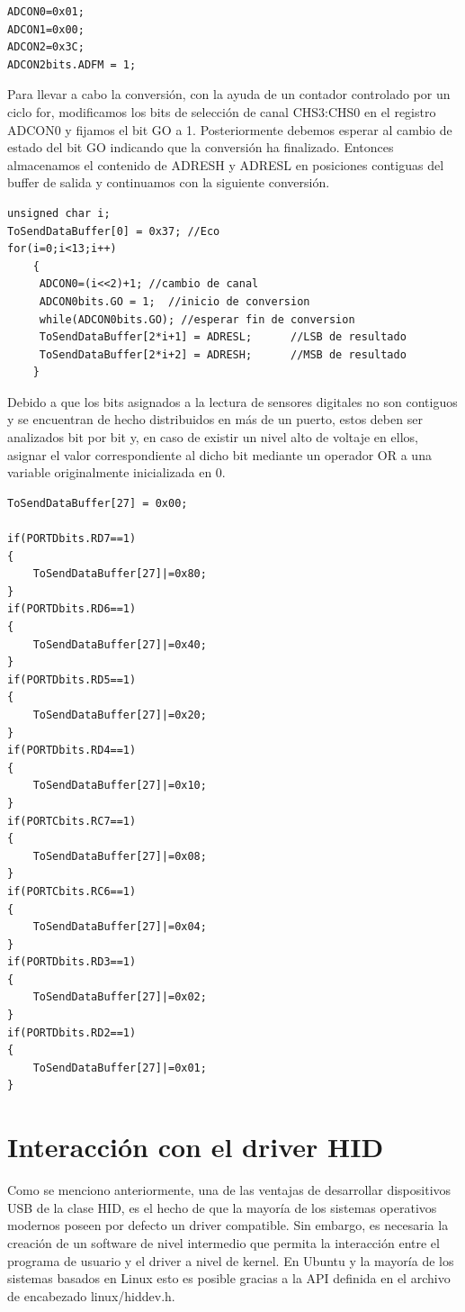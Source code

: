 \documentclass[letterpaper,openright,12pt]{book}
\begin{document}
\begin{lstlisting}
ADCON0=0x01;
ADCON1=0x00;
ADCON2=0x3C;
ADCON2bits.ADFM = 1;
\end{lstlisting}

Para llevar a cabo la conversión, con la ayuda de un contador controlado por un ciclo for, modificamos los bits de selección de canal CHS3:CHS0 en el registro ADCON0 y fijamos el bit GO a 1. Posteriormente debemos esperar al cambio de estado del bit GO indicando que la conversión ha finalizado. Entonces almacenamos el contenido de ADRESH y ADRESL en posiciones contiguas del buffer de salida y continuamos con la siguiente conversión.\\

\begin{lstlisting}
unsigned char i;
ToSendDataBuffer[0] = 0x37;	//Eco
for(i=0;i<13;i++)
	{						
	 ADCON0=(i<<2)+1; //cambio de canal					
	 ADCON0bits.GO = 1;  //inicio de conversion     
	 while(ADCON0bits.GO); //esperar fin de conversion
	 ToSendDataBuffer[2*i+1] = ADRESL;  	//LSB de resultado
	 ToSendDataBuffer[2*i+2] = ADRESH;  	//MSB de resultado
	}    
\end{lstlisting}

Debido a que los bits asignados a la lectura de sensores digitales no son contiguos y se encuentran de hecho distribuidos en más de un puerto, estos deben ser analizados bit por bit y, en caso de existir un nivel alto de voltaje en ellos, asignar el valor correspondiente al dicho bit mediante un operador OR a una variable originalmente inicializada en 0.

\begin{lstlisting}
ToSendDataBuffer[27] = 0x00;
						
if(PORTDbits.RD7==1)
{
	ToSendDataBuffer[27]|=0x80;
}
if(PORTDbits.RD6==1)
{
	ToSendDataBuffer[27]|=0x40;
}
if(PORTDbits.RD5==1)
{
	ToSendDataBuffer[27]|=0x20;
}
if(PORTDbits.RD4==1)
{
	ToSendDataBuffer[27]|=0x10;
}
if(PORTCbits.RC7==1)
{
	ToSendDataBuffer[27]|=0x08;
}
if(PORTCbits.RC6==1)
{
	ToSendDataBuffer[27]|=0x04;
}
if(PORTDbits.RD3==1)
{
	ToSendDataBuffer[27]|=0x02;
}
if(PORTDbits.RD2==1)
{
	ToSendDataBuffer[27]|=0x01;
}
\end{lstlisting}
\section{Interacción con el driver HID}
Como se menciono anteriormente, una de las ventajas de desarrollar dispositivos USB de la clase HID, es el hecho de que la mayoría de los sistemas operativos modernos poseen por defecto un driver compatible. Sin embargo, es necesaria la creación de un software de nivel intermedio que permita la interacción entre el programa de usuario y el driver a nivel de kernel. En Ubuntu y la mayoría de los sistemas basados en Linux esto es posible gracias a la API definida en el archivo de encabezado linux/hiddev.h.
\end{document}
